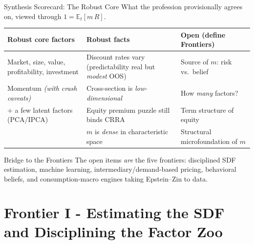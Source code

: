 \documentclass{beamer}
\newcommand{\E}{\mathbb{E}}
\begin{document}
\begin{frame}{Synthesis Scorecard: The Robust Core}
What the profession provisionally agrees on, viewed through $1 = \E_t[m\,R]$.
\vspace{2pt}
\begin{center}\footnotesize
\begin{tabular}{@{}p{}p{}p{}@{}}
\toprule
\textbf{Robust core factors} & \textbf{Robust facts} & \textbf{Open (define Frontiers)} \\
\midrule
Market, size, value, profitability, investment & Discount rates vary (predictability real but \emph{modest} OOS) & \alert{Source of $m$}: risk vs.\ belief \\
Momentum \textit{(with crash caveats)} & Cross-section is \emph{low-dimensional} & How \emph{many} factors? \\
$+$ a few latent factors (PCA/IPCA) & Equity premium puzzle still binds CRRA & Term structure of equity \\
 & $m$ is \emph{dense} in characteristic space & Structural microfoundation of $m$ \\
\bottomrule
\end{tabular}
\end{center}
\vspace{3pt}
\begin{block}{Bridge to the Frontiers}
\alert{The open items \emph{are} the five frontiers}: disciplined SDF estimation, machine learning, intermediary/demand-based pricing, behavioral beliefs, and consumption-macro engines taking Epstein--Zin to data.
\end{block}
\end{frame}

\section{Frontier I - Estimating the SDF and Disciplining the Factor Zoo}
\end{document}
